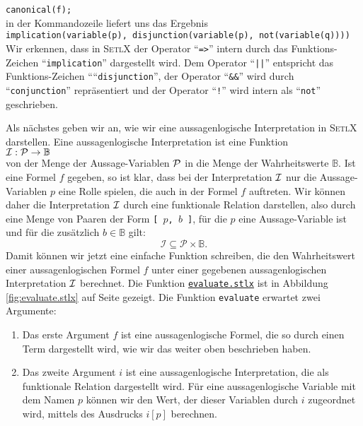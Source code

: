 \hspace*{1.3cm}
\texttt{canonical(f);}
\\[0.2cm]
in der Kommandozeile liefert uns das Ergebnis
\\[0.2cm]
\hspace*{1.3cm}
\texttt{implication(variable(p), disjunction(variable(p), not(variable(q))))}
\\[0.2cm]
Wir erkennen, dass in \textsc{SetlX} der Operator ``\texttt{=>}'' intern
durch das Funktions-Zeichen ``\texttt{implication}'' dargestellt wird.
Dem Operator ``\texttt{||}'' entspricht das Funktions-Zeichen ````\texttt{disjunction}'',
der Operator ``\texttt{\&\&}'' wird durch ``\texttt{conjunction}'' repr\"{a}sentiert und
der Operator ``\texttt{!}'' wird intern als  ``\texttt{not}'' geschrieben.

Als n\"{a}chstes geben wir an, wie wir eine aussagenlogische Interpretation in \textsc{SetlX}
darstellen.  Eine aussagenlogische Interpretation ist eine Funktion \\[0.2cm]
\hspace*{1.3cm} ${\cal I}: {\cal P} \rightarrow \mathbb{B}$ \\[0.2cm]
von der Menge der Aussage-Variablen ${\cal P}$ in die Menge der Wahrheitswerte 
$\mathbb{B}$.  Ist eine Formel $f$ gegeben, so ist klar, dass bei der
Interpretation ${\cal I}$ nur die Aussage-Variablen $p$ eine Rolle spielen,
die auch in der Formel $f$ auftreten.  Wir k\"{o}nnen daher die Interpretation
${\cal I}$ durch eine funktionale Relation darstellen, also durch eine Menge von
Paaren der Form \texttt{[ $p$, $b$ ]}, f\"{u}r die $p$ eine Aussage-Variable ist und f\"{u}r die zus\"{a}tzlich
$b \in \mathbb{B}$ gilt:
\[ \mathcal{I} \subseteq \mathcal{P} \times \mathbb{B}. \]
Damit k\"{o}nnen wir jetzt eine einfache Funktion schreiben, die den Wahrheitswert
einer aussagenlogischen Formel $f$ unter einer gegebenen aussagenlogischen
Interpretation ${\cal I}$ berechnet. Die Funktion
\href{https://github.com/karlstroetmann/Logik/blob/master/SetlX/evaluate.stlx}{\texttt{evaluate.stlx}}
ist in Abbildung \ref{fig:evaluate.stlx} auf Seite \pageref{fig:evaluate.stlx} gezeigt.
Die Funktion \texttt{evaluate} erwartet zwei Argumente:
\begin{enumerate}
\item Das erste Argument $f$ ist eine aussagenlogische Formel, die so durch einen Term dargestellt
      wird, wie wir das weiter oben beschrieben haben.
\item Das zweite Argument $i$ ist eine aussagenlogische Interpretation, die als funktionale Relation
      dargestellt wird.  F\"{u}r eine aussagenlogische Variable mit dem Namen $p$ k\"{o}nnen wir den Wert,
      der dieser Variablen durch $i$ zugeordnet wird, mittels des Ausdrucks $i[p]$ berechnen.
\end{enumerate}

